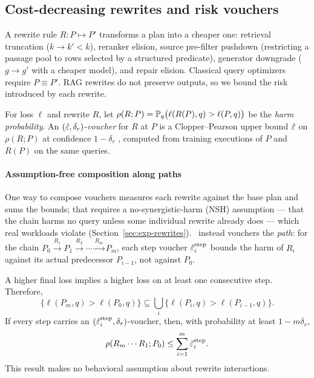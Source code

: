 \subsection{Cost-decreasing rewrites and risk vouchers}
\label{sec:rewrites}

A rewrite rule $R : P \mapsto P'$ transforms a plan into a cheaper one:
retrieval truncation ($k \to k' < k$), reranker elision, source
pre-filter pushdown (restricting a passage pool to rows selected by a
structured predicate), generator downgrade ($g \to g'$ with a cheaper
model), and repair elision. Classical query optimizers
\citep{selinger1979access,graefe1995cascades} require
$P \equiv P'$. RAG rewrites do not preserve outputs, so we bound the
risk introduced by each rewrite.

\begin{definition}
\label{def:voucher}
For loss $\ell$ and rewrite $R$, let
$\rho(R; P) = \mathbb{P}_{q}\big(\ell(R(P), q) > \ell(P, q)\big)$ be the
\emph{harm probability}. An $(\hat{\varepsilon}, \delta_r)$-\emph{voucher} for
$R$ at $P$ is a Clopper--Pearson upper bound $\hat{\varepsilon}$ on $\rho(R;P)$
at confidence $1-\delta_r$ \citep{clopper1934confidence}, computed from training executions of $P$
and $R(P)$ on the same queries.
\end{definition}

\paragraph{Assumption-free composition along paths}
One way to compose vouchers measures each rewrite against the
base plan and sums the bounds; that requires a no-synergistic-harm
(NSH) assumption --- that the chain harms no query unless some
individual rewrite already does --- which real workloads violate
(Section~\ref{sec:exp-rewrites}). \system\ instead vouchers the
\emph{path}: for the chain
$P_0 \xrightarrow{R_1} P_1 \xrightarrow{R_2} \cdots \xrightarrow{R_m}
P_m$, each step voucher $\hat{\varepsilon}_i^{\mathrm{step}}$ bounds the harm of
$R_i$ against its actual predecessor $P_{i-1}$, not against $P_0$.

\begin{proposition}
\label{prop:composition}
A higher final loss implies a higher loss on at least one consecutive
step. Therefore,
\[
\{\ell(P_m,q) > \ell(P_0,q)\}
\subseteq \bigcup_i \{\ell(P_i,q) > \ell(P_{i-1},q)\}.
\]
If every step carries an
$(\hat{\varepsilon}_i^{\mathrm{step}}, \delta_r)$-voucher, then, with probability
at least $1-m\delta_r$,
\[
\rho(R_m \cdots R_1; P_0)
\le \sum_{i=1}^m \hat{\varepsilon}_i^{\mathrm{step}}.
\]
This result makes no behavioral assumption about rewrite interactions.
\end{proposition}

